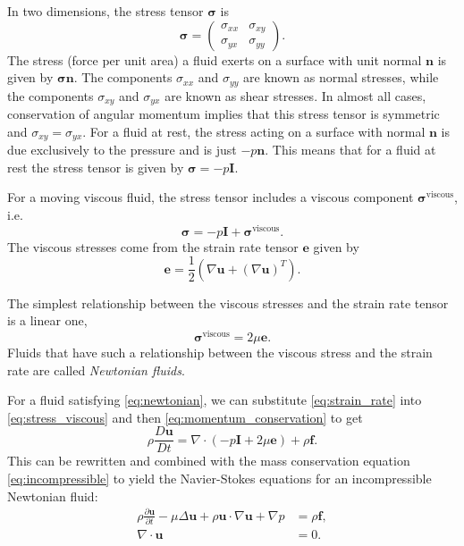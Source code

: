 In two dimensions, the stress tensor $\pmb{\sigma}$ is
\[ \pmb{\sigma} = \begin{pmatrix} \sigma_{xx} & \sigma_{xy} \\ \sigma_{yx} & \sigma_{yy}\end{pmatrix}.\]
The stress (force per unit area) a fluid exerts on a surface with unit normal $\mathbf{n}$ is given by $\pmb{\sigma}\mathbf{n}$. The components $\sigma_{xx}$ and $\sigma_{yy}$ are known as normal stresses, while the components $\sigma_{xy}$ and $\sigma_{yx}$ are known as shear stresses. In almost all cases, conservation of angular momentum implies that this stress tensor is symmetric and $\sigma_{xy} = \sigma_{yx}$. For a fluid at rest, the stress acting on a surface with normal $\mathbf{n}$ is due exclusively to the pressure and is just $-p\mathbf{n}$. This means that for a fluid at rest the stress tensor is given by $\pmb{\sigma} = -p\mathbf{I}$. 

For a moving viscous fluid, the stress tensor includes a viscous component $\pmb{\sigma}^{\text{viscous}}$, i.e.
\begin{equation}\label{eq:stress_viscous} \pmb{\sigma} = -p\mathbf{I} + \pmb{\sigma}^{\text{viscous}}.\end{equation}
The viscous stresses come from the strain rate tensor $\mathbf{e}$ given by
\begin{equation}\label{eq:strain_rate}
\mathbf{e} = \frac{1}{2}\left(\nabla\mathbf{u} + \left(\nabla\mathbf{u}\right)^T\right).
\end{equation}

The simplest relationship between the viscous stresses and the strain rate tensor is a linear one,
\begin{equation}\label{eq:newtonian} \pmb{\sigma}^\text{viscous} =2\mu\mathbf{e}.\end{equation}
Fluids that have such a relationship between the viscous stress and the strain rate are called \textit{Newtonian fluids}. 

For a fluid satisfying \eqref{eq:newtonian}, we can substitute \eqref{eq:strain_rate} into \eqref{eq:stress_viscous} and then \eqref{eq:momentum_conservation} to get
\[ \rho\frac{D\mathbf{u}}{D t} = \nabla\cdot(-p\mathbf{I} + 2\mu\mathbf{e}) + \rho\mathbf{f}.\]
This can be rewritten and combined with the mass conservation equation \eqref{eq:incompressible} to yield the Navier-Stokes equations for an incompressible Newtonian fluid:
\begin{subequations}\label{eq:navier_stokes}
\begin{align}
	\rho\frac{\partial\mathbf{u}}{\partial t} -\mu\Delta\mathbf{u} + \rho\mathbf{u}\cdot\nabla\mathbf{u} + \nabla p &= \rho\mathbf{f},\\
	\nabla\cdot\mathbf{u} &= 0.
\end{align}
\end{subequations}

